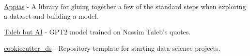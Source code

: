 \begin{cventries}
\vspace{-\baselineskip}

\cventry{}{}{}{}
{
    \begin{cvitems}
    \item \href{https://github.com/aglove2189/appias}{\faExternalLink\acvHeaderIconSep Appias}{ - A library for gluing together a few of the standard steps when exploring a dataset and building a model.}
    \item \href{https://twitter.com/taleb_gpt2}{\faTwitter\acvHeaderIconSep Taleb but AI}{ - GPT2 model trained on Nassim Taleb's quotes.}
    \item \href{https://github.com/aglove2189/cookiecutter_ds}{\faExternalLink\acvHeaderIconSep cookiecutter\_ds}{ - Repository template for starting data science projects.}
    \end{cvitems}
}

\end{cventries}